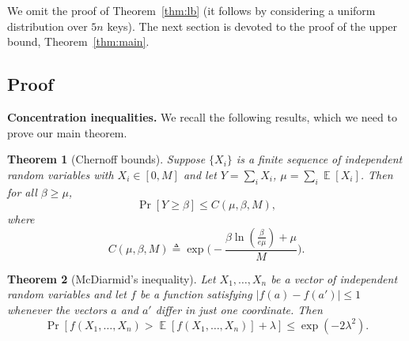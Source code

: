 \documentclass[10pt,conference,letterpaper]{IEEEtran}
\newcommand{\spara}[1]{\smallskip\noindent\textbf{#1}}
\newcommand{\mycomment}[1]{}
\DeclareMathOperator*{\expect}{\mathbb{E}}
\newtheorem{theorem}{Theorem}[section]
\begin{document}
We omit the proof of Theorem~\ref{thm:lb} (it follows by considering a uniform distribution over $5 n$ keys).
The next section is devoted to the proof of the upper bound, Theorem~\ref{thm:main}. 



\subsection{Proof}
\mycomment{
First define $\tau_d^\calD$.



\begin{theorem}
Conditioned on $\tau_d^\calD$, with high probability after $m$ throws the normalized imbalance after running the \code{Greedy-$d$} process satisfies
$$
\widehat{I}(m) \le (\tau_d^\calD - 1) + \sqrt{\frac{n \ln n \ln m}{m}}.
$$
Also, the optimal normalized imbalance after the hash functions are chosen satisfies
$$\widehat{I}^*(m) \ge (\tau_d^\calD - 1) + \sqrt{\frac{\ln n}{m}}.$$
\end{theorem}

\begin{theorem}
With high probability,
     $$\tau_d^\calD = \min(O(\frac{\ln n}{\ln \ln n}), \frac{1}{n} + \sqrt{p_1 n \ln n}$$
and
for $d \ge 2$,
        $$\tau_d^\calD = \min(O(\frac{1}{n} + p_1)).$$
\end{theorem}

In particular, when $p_1 \le \frac{1}{n^3 \ln n}$, the maximum load will be $O(m / n)$ whether we use one choice or $d > 1$ choices.
On the other hand,
From these results we see that when $p_1 \ge \frac{1}{n}$, the imbalance with $d = 1$ or
In the typical case we consider where $p_1 < \frac{1}{n}$,

}



\spara{Concentration inequalities.}
We recall the following results, which we need to prove our main theorem.
\begin{theorem}[Chernoff bounds]\label{chernoff}
Suppose $\{X_i\}$ is a finite sequence of independent random variables with $X_i \in [0, M]$ and let $Y = \sum_i X_i$, $\mu = \sum_i \expect[X_i]$.
Then for all $\beta \ge \mu$,
$$ \Pr[ Y \ge \beta ] \le C(\mu, \beta, M) , $$
where
$$ C(\mu, \beta, M) \triangleq \exp\Big(-\frac{\beta \ln(\frac{\beta}{e \mu}) + \mu}{M}\Big). $$\end{theorem}


\begin{theorem}[McDiarmid's inequality]\label{bounded_dif}
Let $X_1, \ldots, X_n$ be a vector of independent random variables and let $f$ be a function satisfying
    $ |f(a) - f(a') | \le 1$
whenever the vectors $a$ and $a'$ differ in just one coordinate. Then
$$ \Pr[  f(X_1, \ldots, X_n) > \expect[ f(X_1, \ldots, X_n) ] + \lambda ] \le \exp(-2 \lambda^2).$$
\end{theorem}
\end{document}
